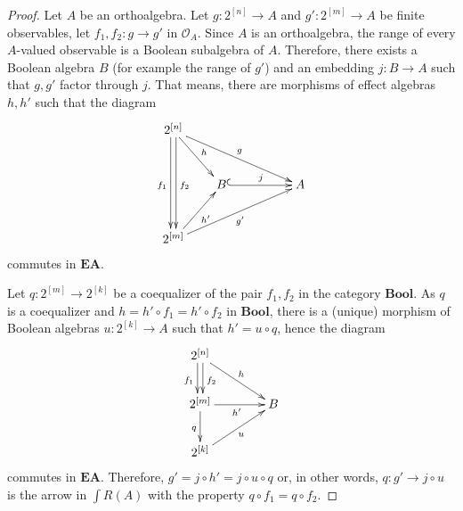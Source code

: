 \documentclass[smallextended]{svjour3}
\begin{document}
\begin{proof}
Let $A$ be an orthoalgebra. 
Let $g:2^{[n]}\to A$ and
$g':2^{[m]}\to A$ be finite observables, let $f_1,f_2:g\to g'$ in ${\mathcal O_{{A}}}$.
Since $A$ is an orthoalgebra, the range of every $A$-valued
observable is a Boolean subalgebra of $A$. Therefore, there exists
a Boolean algebra $B$ (for example the range of $g'$) and an embedding $j:B\to A$ such that $g,g'$
factor through $j$. That means, there are morphisms of effect algebras $h,h'$ such that the diagram
\begin{equation}
\xymatrix@C=2em@R=3em{
2^{[n]}
	\ar@<-.5ex>[dd]_{f_1}
	\ar@<.5ex>[dd]^{f_2}
	\ar[rd]^h
	\ar[rrrd]^g
&
~
&
~
\\
~
&
B
	\ar@{^{(}->}[rr]^j
&
~
&
A
\\
2^{[m]}
	\ar[ru]_{h'}
	\ar[rrru]_{g'}
}
\end{equation}
commutes in ${\mathbf{EA}}$.

Let $q:2^{[m]}\to 2^{[k]}$ be a coequalizer of 
the pair $f_1,f_2$ in the category ${\mathbf{Bool}}$. As $q$ is a coequalizer and 
$h=h'\circ f_1=h'\circ f_2$ in ${\mathbf{Bool}}$, there is a (unique) morphism of Boolean algebras
$u:2^{[k]}\to A$ such that $h'=u\circ q$, hence the diagram 
\begin{equation}
\xymatrix@C=4em{
2^{[n]}
	\ar@<-.5ex>[d]_{f_1}
	\ar@<.5ex>[d]^{f_2}
	\ar[rd]^h
&
~
\\
2^{[m]}
	\ar[r]_{h'}
	\ar[d]_q
&
B
\\
2^{[k]}
	\ar[ru]_u
}
\end{equation}
commutes in ${\mathbf{EA}}$.
Therefore, $g'=j\circ h'=j\circ u\circ q$ or,
in other words, $q:g'\to j\circ u$ is the arrow in ${\int R({A})}$ with the property $q\circ f_1=q\circ f_2$.


\end{proof}
\end{document}

